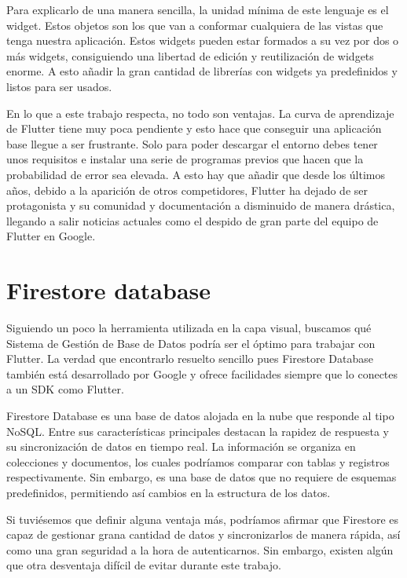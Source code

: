	Para explicarlo de una manera sencilla, la unidad mínima de este lenguaje es el widget. Estos objetos son los que van a conformar cualquiera de las vistas que tenga nuestra aplicación. Estos widgets pueden estar formados a su vez por dos o más widgets, consiguiendo una libertad de edición y reutilización de widgets enorme. A esto añadir la gran cantidad de librerías con widgets ya predefinidos y listos para ser usados.
	
	En lo que a este trabajo respecta, no todo son ventajas. La curva de aprendizaje de Flutter tiene muy poca pendiente y esto hace que conseguir una aplicación base llegue a ser frustrante. Solo para poder descargar el entorno debes tener unos requisitos e instalar una serie de programas previos que hacen que la probabilidad de error sea elevada. A esto hay que añadir que desde los últimos años, debido a la aparición de otros competidores, Flutter ha dejado de ser protagonista y su comunidad y documentación a disminuido de manera drástica, llegando a salir noticias actuales como el despido de gran parte del equipo de Flutter en Google.
	
	
\section{Firestore database}

	Siguiendo un poco la herramienta utilizada en la capa visual, buscamos qué Sistema de Gestión de Base de Datos podría ser el óptimo para trabajar con Flutter. La verdad que encontrarlo resuelto sencillo pues Firestore Database también está desarrollado por Google y ofrece facilidades siempre que lo conectes a un SDK como Flutter.
	
	Firestore Database es una base de datos alojada en la nube que responde al tipo NoSQL. Entre sus características principales destacan la rapidez de respuesta y su sincronización de datos en tiempo real. La información se organiza en colecciones y documentos, los cuales podríamos comparar con tablas y registros respectivamente. Sin embargo, es una base de datos que no requiere de esquemas predefinidos, permitiendo así cambios en la estructura de los datos.
	
	Si tuviésemos que definir alguna ventaja más, podríamos afirmar que Firestore es capaz de gestionar grana cantidad de datos y sincronizarlos de manera rápida, así como una gran seguridad a la hora de autenticarnos. Sin embargo, existen algún que otra desventaja difícil de evitar durante este trabajo.
	
